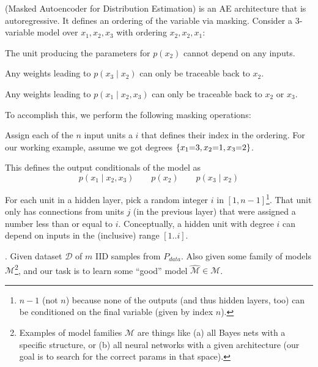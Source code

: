 \documentclass[11pt]{article}
\newcommand\myspace[1][]{\vspace{#1\bigskipamount}\Needspace{10\baselineskip}}
\newcommand\p{\Needspace{10\baselineskip} \noindent}
\newcommand\bluesec[1]{\myspace \p \blue{#1}}
\begin{document}
 (Masked Autoencoder for Distribution Estimation) is an AE architecture that is autoregressive. It defines an ordering of the variable via masking. Consider a 3-variable model over $x_1, x_2, x_3$ with ordering $x_2, x_2, x_1$:
\begin{compactitem}
	\item The unit producing the parameters for  $p(x_2)$ cannot depend on any inputs.
	
	\item Any weights leading to $p(x_3 \mid x_2)$ can only be traceable back to $x_2$.
	
	\item Any weights leading to $p(x_1 \mid x_2, x_3)$ can only be traceable back to $x_2$ or $x_3$.
\end{compactitem}
To accomplish this, we perform the following masking operations:
\begin{compactitem}
	\item Assign each of the $n$ input units a  $i$ that defines their index in the ordering. For our working example, assume we got degrees $\{x_1 {=} 3, x_2 {=} 1, x_3 {=} 2\}$. 
	
	\item  This defines the output conditionals of the model as 
	$$
		p(x_1 \mid x_2, x_3) \qquad p(x_2) \qquad p(x_3 \mid x_2)
	$$
	
	\item For each unit in a hidden layer, pick a random integer $i$ in $[1, n-1]$\footnote{$n-1$ (not $n$) because none of the outputs (and thus hidden layers, too) can be conditioned on the final variable (given by index $n$).}.  That unit only has connections from units $j$ (in the previous layer) that were assigned a number less than or equal to $i$. Conceptually, a hidden unit with degree $i$ can depend on inputs in the (inclusive) range $[1..i]$.
\end{compactitem}

\bluesec{Learning Setting} . Given dataset $\mathcal D$ of $m$ IID samples from $P_{data}$. Also given some family of models $\mathcal M$\footnote{Examples of model families $\mathcal M$ are things like (a) all Bayes nets with a specific structure, or (b) all neural networks with a given architecture (our goal is to search for the correct params in that space).}, and our task is to learn some ``good'' model $\hat{ \mathcal M } \in \mathcal M$. 
\end{document}

